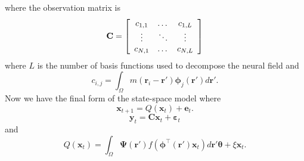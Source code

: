 \documentclass[10pt,a4paper]{article}
\begin{document}
where the observation matrix is 
\begin{equation}
	\mathbf{C} = \left[
	\begin{array}{{ccc}} 
		c_{1,1} & \dots & c_{1,L} \\
		\vdots & \ddots & \vdots \\
		c_{N,1} & \dots & c_{N,L} 
	\end{array}
	\right] 
\end{equation}
where $L$ is the number of basis functions used to decompose the neural field and 
\begin{equation}
	c_{i,j} = \int_{\Omega}m(\mathbf{r}_i - \mathbf{r}')\boldsymbol{\phi}_j(\mathbf{r}')d\mathbf{r}'. 
\end{equation}
Now we have the final form of the state-space model where
\begin{equation}\label{eq:finalformstatespacemodel}
	\mathbf{x}_{t+1} = Q(\mathbf{x}_t) +\mathbf{e}_t.
\end{equation}
\begin{equation} 
	\mathbf{y}_t = \mathbf{C}\mathbf{x}_t + \boldsymbol{\varepsilon}_t
\end{equation}
and 
\begin{equation}\label{eq:QmatrixForSigmapoints}
	Q(\mathbf{x}_t) = \int_\Omega \boldsymbol{\Psi}(\mathbf{r}') f(\boldsymbol{\phi}^{\top}(\mathbf{r}')\mathbf{x}_t) d\mathbf{r}' \boldsymbol{\theta} + \xi\mathbf{x}_t.
\end{equation}

\end{document}
